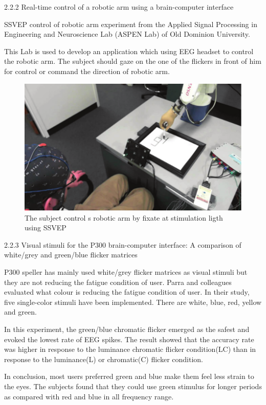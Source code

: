 2.2.2 Real-time control of a robotic arm using a brain-computer interface\cite{asy}

SSVEP control of robotic arm experiment from the Applied Signal Processing in Engineering and Neuroscience Lab (ASPEN Lab) of Old Dominion University.\par
This Lab is used to develop an application which using EEG headset to control the robotic arm. The subject should gaze on the one of the flickers in front of him for control or command the direction of robotic arm.\\
\begin{figure}[h]
	\centering
  	\includegraphics[scale = 0.70]{22.pdf}
  	\caption{The subject control s robotic arm by fixate at stimulation ligth using SSVEP}
\end{figure}
\newpage

2.2.3	Visual stimuli for the P300 brain-computer interface: A comparison of white/grey and green/blue flicker matrices\cite{vis}

P300 speller has mainly used white/grey flicker matrices as visual stimuli but they are not reducing the fatigue condition of user. Parra and colleagues evaluated what colour is reducing the fatigue condition of user. In their study, five single-color stimuli have been implemented. There are white, blue, red, yellow and green.\par
In this experiment, the green/blue chromatic flicker emerged as the safest and evoked the lowest rate of EEG spikes. The result showed that the accuracy rate was higher in response to the luminance chromatic flicker condition(LC) than in response to the luminance(L) or chromatic(C) flicker condition.

In conclusion, most users preferred green and blue make them feel less strain to the eyes. The subjects found that they could use green stimulus for longer periods as compared with red and blue in all frequency range.

